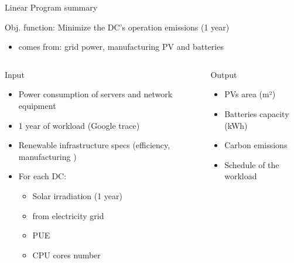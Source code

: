 \documentclass[Ligatures=TeX,table,svgnames,usetotalslideindicator,compress,10pt]{beamer}
\begin{document}
\begin{frame}{  Linear Program summary}

  \alert{Obj. function:} Minimize the DC's operation  emissions (1 year)
  \begin{itemize}
  \item {} comes from: grid power, manufacturing PV and batteries
  \end{itemize}
  
  \begin{columns}[T]
    \begin{column}{0.55\textwidth}
      \pause
      \alert{Input}

      \begin{itemize}
      \item Power consumption of servers and network equipment
      \item 1 year of workload  (Google trace)
      \item Renewable infrastructure specs (efficiency, manufacturing )
      \item For each DC:
        \begin{itemize}
        \item Solar irradiation (1 year)
        \item {} from electricity grid
        \item PUE       
        \item CPU cores number
        \end{itemize}
      \end{itemize}
      
    \end{column}

    \begin{column}{0.45\textwidth}
      
      \pause          
      \alert{Output}
      
      \begin{itemize}          
      \item PVs area (m²)          
      \item Batteries capacity (kWh)                  
      \item Carbon emissions 
      \item Schedule of the workload         
      \end{itemize}
    \end{column}
  \end{columns}      
\end{frame}
\end{document}
